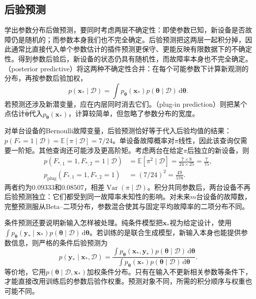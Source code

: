 \subsection{后验预测}
\label{sec:pgm-parameter-learning-posterior-predictive}

学出参数分布后做预测，要同时考虑两层不确定性：即使参数已知，新设备是否故障仍是随机的；而参数本身我们也不完全确定。后验预测把这两层一起积分掉，因此通常比直接代入单个参数估计的插件预测更保守、更能反映有限数据下的不确定性。得到参数后验后，新设备的状态仍具有随机性，而故障率本身也不完全确定。（posterior predictive）将这两种不确定性合并：在每个可能参数下计算新观测的分布，再按参数后验加权，
\begin{equation}
  p(\bm{x}_*\mid\mathcal{D})
   =\int p_{\bm{\theta}}(\bm{x}_*)
            p(\bm{\theta}\mid\mathcal{D})\,\mathrm{d}\bm{\theta}.
  \label{eq:pgm-parameter-learning-posterior-predictive}
\end{equation}
若预测还涉及新潜变量，应在内层同时消去它们。（plug-in prediction）则把某个点估计$\widehat{\bm{\theta}}$代入$p_{\bm{\theta}}(\bm{x}_*)$，计算较简单，但忽略了参数分布的宽度。

对单台设备的Bernoulli故障变量，后验预测恰好等于代入后验均值的结果：$p(F_*=1\mid\mathcal{D})=\mathbb{E}[\pi\mid\mathcal{D}]=7/24$。单设备故障概率对$\pi$线性，因此该查询仅需要一阶矩。其他查询还可能涉及更高阶矩。考虑两台在给定$\pi$后独立的新设备，则
\[
  \begin{aligned}
    p(F_{*,1}=1,F_{*,2}=1\mid\mathcal{D})
      &=\mathbb{E}[\pi^2\mid\mathcal{D}]
        =\frac{7\times8}{24\times25}
        =\frac{7}{75},\\
    p_{\mathrm{plug}}(F_{*,1}=1,F_{*,2}=1)
      &=(7/24)^2=\frac{49}{576}.
  \end{aligned}
\]
两者约为$0.09333$和$0.08507$，相差$\operatorname{Var}(\pi\mid\mathcal{D})$。积分共同参数后，两台设备不再后验预测独立：它们都受到同一故障率未知性的影响。对未来$m$台设备的故障数，完整预测服从Beta--二项分布，参数混合使其与固定平均故障率的二项分布不同。

条件预测还要说明新输入怎样被处理。纯条件模型把$\bm{x}_*$视为给定设计，使用$\int p_{\bm{\theta}}(\bm{y}_*\mid\bm{x}_*)p(\bm{\theta}\mid\mathcal{D})\,\mathrm{d}\bm{\theta}$。若训练的是联合生成模型，新输入本身也能提供参数信息，则严格的条件后验预测为
\[
  p(\bm{y}_*\mid\bm{x}_*,\mathcal{D})
  =\frac{\int p_{\bm{\theta}}(\bm{x}_*,\bm{y}_*)
                      p(\bm{\theta}\mid\mathcal{D})\,\mathrm{d}\bm{\theta}}
         {\int p_{\bm{\theta}}(\bm{x}_*)
                      p(\bm{\theta}\mid\mathcal{D})\,\mathrm{d}\bm{\theta}}.
\]
等价地，它用$p(\bm{\theta}\mid\mathcal{D},\bm{x}_*)$加权条件分布。只有在输入不更新相关参数等条件下，才能直接改用训练后的参数后验作权重。预测对象不同，所需的积分顺序与权重也可能不同。

